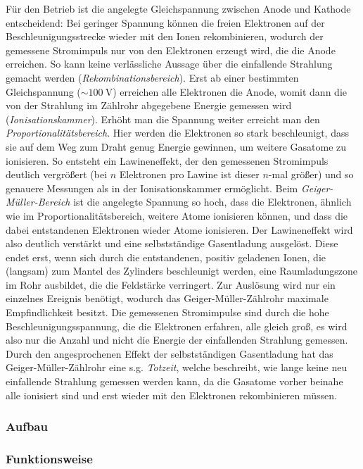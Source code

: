 \documentclass[11pt, a4paper]{article}
\numberwithin{equation}{section}
\begin{document}
Für den Betrieb ist die angelegte Gleichspannung zwischen Anode und Kathode entscheidend:
Bei geringer Spannung können die freien Elektronen auf der Beschleunigungsstrecke wieder mit den Ionen rekombinieren, wodurch der gemessene Stromimpuls nur von den Elektronen erzeugt wird, die die Anode erreichen.
So kann keine verlässliche Aussage über die einfallende Strahlung gemacht werden (\emph{Rekombinationsbereich}).
Erst ab einer bestimmten Gleichspannung ($\sim \SI{100}{\volt}$) erreichen alle Elektronen die Anode, womit dann die von der Strahlung im Zählrohr abgegebene Energie gemessen wird (\emph{Ionisationskammer}).
Erhöht man die Spannung weiter erreicht man den \emph{Proportionalitätsbereich}.
Hier werden die Elektronen so stark beschleunigt, dass sie auf dem Weg zum Draht genug Energie gewinnen, um weitere Gasatome zu ionisieren.
So entsteht ein Lawineneffekt, der den gemessenen Stromimpuls deutlich vergrößert (bei $n$ Elektronen pro Lawine ist dieser $n$-mal größer) und so genauere Messungen als in der Ionisationskammer ermöglicht.
Beim \emph{Geiger-Müller-Bereich} ist die angelegte Spannung so hoch, dass die Elektronen, ähnlich wie im Proportionalitätsbereich, weitere Atome ionisieren können, und dass die dabei entstandenen Elektronen wieder Atome ionisieren.
Der Lawineneffekt wird also deutlich verstärkt und eine selbstständige Gasentladung ausgelöst.
Diese endet erst, wenn sich durch die entstandenen, positiv geladenen Ionen, die (langsam) zum Mantel des Zylinders beschleunigt werden, eine Raumladungszone im Rohr ausbildet, die die Feldstärke verringert.
Zur Auslösung wird nur ein einzelnes Ereignis benötigt, wodurch das Geiger-Müller-Zählrohr maximale Empfindlichkeit besitzt.
Die gemessenen Stromimpulse sind durch die hohe Beschleunigungsspannung, die die Elektronen erfahren, alle gleich groß, es wird also nur die Anzahl und nicht die Energie der einfallenden Strahlung gemessen.
Durch den angesprochenen Effekt der selbstständigen Gasentladung hat das Geiger-Müller-Zählrohr eine s.g. \emph{Totzeit}, welche beschreibt, wie lange keine neu einfallende Strahlung gemessen werden kann, da die Gasatome vorher beinahe alle ionisiert sind und erst wieder mit den Elektronen rekombinieren müssen.

\subsubsection{Aufbau}

\subsubsection{Funktionsweise}
\end{document}
